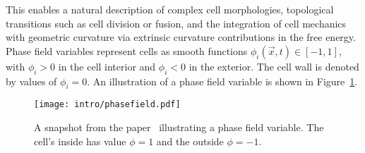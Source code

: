 This enables a natural description of complex cell morphologies, topological transitions such as cell division or fusion, and the integration of cell mechanics with geometric curvature via extrinsic curvature contributions in the free energy. \\
Phase field variables represent cells as smooth functions $\phi_i(\vec{x}, t) \in [-1, 1]$, with $\phi_i > 0$ in the cell interior and $\phi_i <0$ in the exterior. 
The cell wall is denoted by values of $\phi_i = 0$. 
An illustration of a phase field variable is shown in Figure~\ref{fig:phasefield}. \\
\begin{figure}[h!]
	\centering
	\texttt{[image: intro/phasefield.pdf]}
	\caption{A snapshot from the paper~\cite{alert2020} illustrating a phase field variable. 
	The cell's inside has value $\phi = 1$ and the outside $\phi = -1$. 
	}
	\label{fig:phasefield}
\end{figure}

